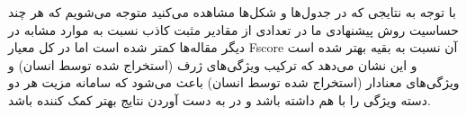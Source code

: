 \noindent
با توجه به نتایجی که در جدول‌ها و شکل‌ها مشاهده می‌کنید متوجه می‌شویم که هر چند حساسیت روش پیشنهادی ما در تعدادی از مقادیر مثبت کاذب نسبت به موارد مشابه در دیگر مقاله‌ها کمتر شده است اما در کل معیار Fscore آن نسبت به بقیه بهتر شده است و این نشان می‌دهد که ترکیب ویژگی‌های ژرف (استخراج شده توسط انسان) و ویژگی‌های معنادار (استخراج شده توسط انسان) باعث می‌شود که سامانه مزیت هر دو دسته ویژگی را با هم داشته باشد و در به دست آوردن نتایج بهتر کمک کننده باشد.
